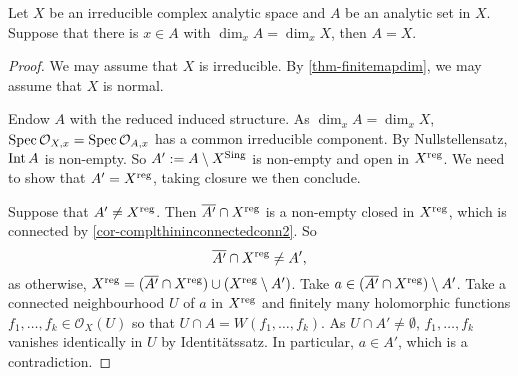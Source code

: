 \begin{corollary}\label{cor-normirrdimpointequal}
    Let $X$ be an irreducible complex analytic space and $A$ be an analytic set in $X$. Suppose that there is $x\in A$ with $\dim_x A=\dim_x X$, then $A=X$.
\end{corollary}
\begin{proof}
    We may assume that $X$ is irreducible.
    By \cref{thm-finitemapdim}, we may assume that $X$ is normal.

    Endow $A$ with the reduced induced structure.
    As $\dim_x A=\dim_x X$, $\operatorname{Spec} \mathcal{O}_{X,x}=\operatorname{Spec} \mathcal{O}_{A,x}$ has a common irreducible component. By Nullstellensatz, $\operatorname{Int} A$ is non-empty. So $A':=A\setminus X^{\operatorname{Sing}}$ is non-empty and open in $X^{\operatorname{reg}}$. We need to show that $A'=X^{\operatorname{reg}}$, taking closure we then conclude.

    Suppose that $A'\neq X^{\operatorname{reg}}$. Then $\overline{A'}\cap X^{\operatorname{reg}}$ is a non-empty closed in $X^{\operatorname{reg}}$, which is connected by \cref{cor-complthininconnectedconn2}. So 
    \[
        \overline{A'}\cap X^{\operatorname{reg}}\neq A',
    \]
    as otherwise, $X^{\operatorname{reg}}=(\overline{A'}\cap X^{\operatorname{reg}})\cup (X^{\operatorname{reg}}\setminus A')$. Take $a\in (\overline{A'}\cap X^{\operatorname{reg}})\setminus A'$. Take a connected neighbourhood $U$ of $a$ in $X^{\operatorname{reg}}$ and finitely many holomorphic functions $f_1,\ldots,f_k\in \mathcal{O}_X(U)$ so that $U\cap A=W(f_1,\ldots,f_k)$. As $U\cap A'\neq \emptyset$, $f_1,\ldots,f_k$ vanishes identically in $U$ by Identitätssatz. In particular, $a\in A'$, which is a contradiction.
\end{proof}

